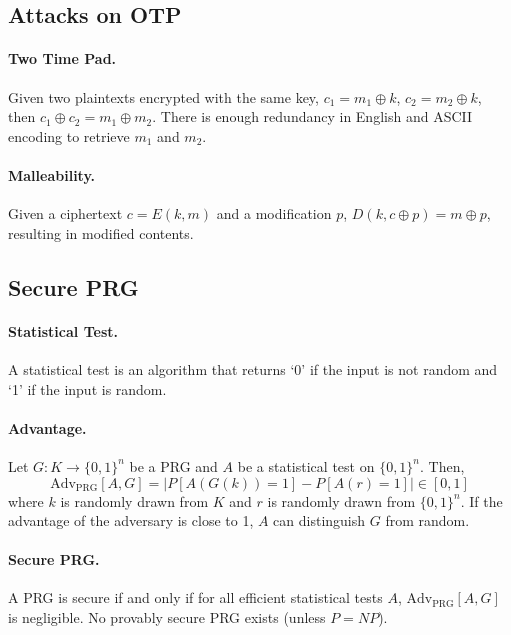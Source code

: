 \documentclass{article}
\begin{document}
\subsection{Attacks on OTP}

\paragraph{Two Time Pad.} Given two plaintexts encrypted with the same key,
$c_1 = m_1 \oplus k$, $c_2 = m_2 \oplus k$, then $c_1 \oplus c_2 = m_1 \oplus
m_2$. There is enough redundancy in English and ASCII encoding to retrieve
$m_1$ and $m_2$.

\paragraph{Malleability.} Given a ciphertext $c = E(k, m)$ and a modification
$p$, $D(k, c \oplus p) = m \oplus p$, resulting in modified contents.

\subsection{Secure PRG}

\paragraph{Statistical Test.} A statistical test is an algorithm that returns
`0' if the input is not random and `1' if the input is random.

\paragraph{Advantage.} Let $G: K \rightarrow \{0, 1\}^n$ be a PRG and $A$ be a
statistical test on $\{0, 1\}^n$. Then, \begin{equation}
  \text{Adv}_\text{PRG}[A, G] = |P[A(G(k)) = 1] - P[A(r) = 1]| \in [0, 1]
  \label{prg:adv}
\end{equation} where $k$ is randomly drawn from $K$ and $r$ is randomly drawn
from $\{0, 1\}^n$. If the advantage of the adversary is close to 1, $A$ can
distinguish $G$ from random.

\paragraph{Secure PRG.} A PRG is secure if and only if for all efficient
statistical tests $A$, $\text{Adv}_\text{PRG}[A, G]$ is negligible. No provably
secure PRG exists (unless $P = NP$).
\end{document}
